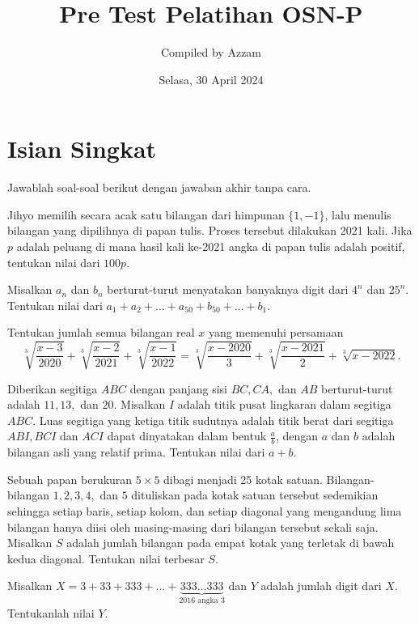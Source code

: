 \documentclass[12pt]{scrartcl}
\begin{document}
	\title{Pre Test Pelatihan OSN-P} %
	\date{Selasa, 30 April 2024}
	\author{Compiled by Azzam}
	\maketitle

\renewcommand*\contentsname{Daftar Isi}
\tableofcontents

\newpage
	\newpage
	
	\section{Isian Singkat}
	Jawablah soal-soal berikut dengan jawaban akhir tanpa cara.
	
	\begin{soalbaru}
		Jihyo memilih secara acak satu bilangan dari himpunan $\{1,-1\}$, lalu menulis bilangan yang dipilihnya di papan tulis. Proses tersebut dilakukan 2021 kali. Jika $p$ adalah peluang di mana hasil kali ke-2021 angka di papan tulis adalah positif, tentukan nilai dari $100p$.
	\end{soalbaru}
	
	
	\begin{soalbaru}
		Misalkan $a_n$ dan $b_n$ berturut-turut menyatakan banyaknya digit dari $4^n$ dan $25^n$. Tentukan nilai dari $a_1+a_2+\dots +a_{50}+b_{50}+\dots+b_1$.
		
	\end{soalbaru}
	
	\begin{soalbaru}
		Tentukan jumlah semua bilangan real $x$ yang memenuhi persamaan $$\sqrt[3]{\frac{x-3}{2020}}+\sqrt[3]{\frac{x-2}{2021}}+\sqrt[3]{\frac{x-1}{2022}}=\sqrt[3]{\frac{x-2020}{3}}+\sqrt[3]{\frac{x-2021}{2}}+\sqrt[3]{x-2022}.$$
	\end{soalbaru}
	
	\begin{soalbaru}
		Diberikan segitiga $ABC$ dengan panjang sisi $BC,CA,$ dan $AB$ berturut-turut adalah $11,13,$ dan $20$. Misalkan $I$ adalah titik pusat lingkaran dalam segitiga $ABC$. Luas segitiga yang ketiga titik sudutnya adalah titik berat dari segitiga $ABI,BCI$ dan $ACI$ dapat dinyatakan dalam bentuk $\frac{a}{b}$, dengan $a$ dan $b$ adalah bilangan asli yang relatif prima. Tentukan nilai dari $a+b$.
	\end{soalbaru}
	
	\begin{soalbaru}
		Sebuah papan berukuran $5 \times 5$ dibagi menjadi 25 kotak satuan. Bilangan-bilangan $1,2,3,4,$ dan $5$ dituliskan pada kotak satuan tersebut sedemikian sehingga setiap baris, setiap kolom, dan setiap diagonal yang mengandung lima bilangan hanya diisi oleh masing-masing dari bilangan tersebut sekali saja. Misalkan $S$ adalah jumlah bilangan pada empat kotak yang terletak di bawah kedua diagonal. Tentukan nilai terbesar $S$.
	\end{soalbaru}
	\begin{soalbaru}
		Misalkan $X = 3 + 33 + 333 + \dots + \underbrace{333 \dots 333}_{2016 \text{ angka } 3}$ dan $Y$ adalah jumlah digit dari $X$. Tentukanlah nilai $Y$.
	\end{soalbaru}
	
\end{document}
